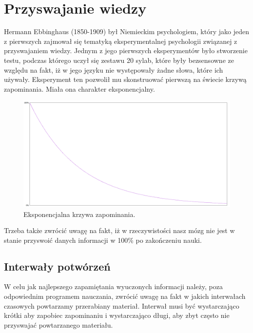 {\let\cleardoublepage\relax \chapter{Przyswajanie wiedzy}}


Hermann Ebbinghaus\cite{HumanMemory} (1850-1909) był Niemieckim psychologiem, który jako jeden z pierwszych zajmował się tematyką eksperymentalnej psychologii związanej z przyswajaniem wiedzy. 
Jednym z jego pierwszych eksperymentów było stworzenie testu, podczas którego uczył się zestawu 20 sylab, które były bezsensowne ze względu na fakt, iż w jego języku nie występowały żadne słowa, które ich używały.
Eksperyment ten pozwolił mu skonstruować pierwszą na świecie krzywą zapominania. Miała ona charakter eksponencjalny. 

\begin{figure}[h]
	\centering
	\includegraphics[width=\textwidth]{images/curve.png}
	 \caption{Eksponencjalna krzywa zapominania.}
\end{figure}

Trzeba także zwrócić uwagę na fakt, iż w rzeczywistości\cite{ForgettingCurve} nasz mózg nie jest w stanie przyswoić danych informacji w 100\% po zakończeniu nauki. 

\section{Interwały potwórzeń}

W celu jak najlepszego zapamiętania wyuczonych informacji należy, poza odpowiednim programem nauczania, zwrócić uwagę na fakt w jakich interwałach czasowych powtarzamy przerabiany materiał\cite{ForgettingCurve}.
Interwał musi być wystarczająco krótki aby zapobiec zapominaniu i wystarczająco długi, aby zbyt często nie przyswajać powtarzanego materiału.



